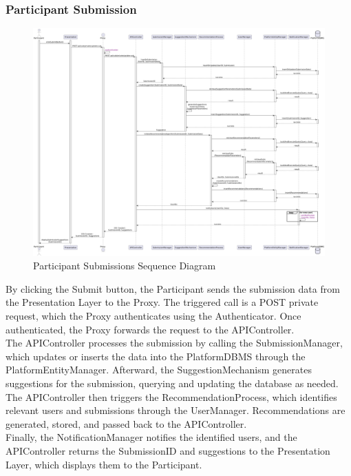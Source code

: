 \subsubsection*{Participant Submission}
\begin{figure}[H]
    \centering
    \includegraphics[width=\linewidth]{Latex/Images/DD/SequenceDiagrams/3ParticipantSubmission.png}
    \caption{Participant Submissions Sequence Diagram}
    \label{fig:participantsubmission}
\end{figure}
By clicking the Submit button, the Participant sends the submission data from the Presentation Layer to the Proxy. The triggered call is a POST private request, which the Proxy authenticates using the Authenticator. Once authenticated, the Proxy forwards the request to the APIController.\\
The APIController processes the submission by calling the SubmissionManager, which updates or inserts the data into the PlatformDBMS through the PlatformEntityManager. Afterward, the SuggestionMechanism generates suggestions for the submission, querying and updating the database as needed.\\
The APIController then triggers the RecommendationProcess, which identifies relevant users and submissions through the UserManager. Recommendations are generated, stored, and passed back to the APIController.\\
Finally, the NotificationManager notifies the identified users, and the APIController returns the SubmissionID and suggestions to the Presentation Layer, which displays them to the Participant.

